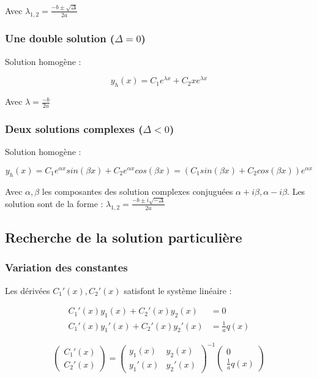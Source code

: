\documentclass[12pt,a4paper]{report}
\begin{document}
Avec $\lambda_{1,2} = \frac{-b \pm \sqrt{\Delta}}{2a}$

\subsubsection{Une double solution ($\Delta = 0$)}

Solution homogène :

$$y_h(x) = C_1e^{\lambda x} + C_2xe^{\lambda x}$$

Avec $\lambda = \frac{-b}{2a}$

\subsubsection{Deux solutions complexes ($\Delta < 0$)}

Solution homogène :

$$y_h(x) = C_1e^{\alpha x} sin(\beta x) + C_2e^{\alpha x} cos(\beta x) = \left( C_1 sin(\beta x) + C_2 cos(\beta x) \right) e^{\alpha x} $$

Avec $\alpha , \beta$ les composantes des solution complexes conjuguées $\alpha + i\beta , \alpha - i\beta$. Les solution sont de la forme : $\lambda_{1,2} = \frac{-b \pm i\sqrt{-\Delta}}{2a}$

\subsection{Recherche de la solution particulière}

\subsubsection{Variation des constantes}

Les dérivées $C_1'(x),C_2'(x)$ satisfont le système linéaire :

\begin{align*}
C_1'(x)y_1(x) + C_2'(x)y_2(x) &= 0 \\
C_1'(x)y_1'(x) + C_2'(x)y_2'(x) &= \frac{1}{a} q(x)
\end{align*}

$$
\begin{pmatrix}
C_1'(x) \\
C_2'(x)
\end{pmatrix}
 =
\begin{pmatrix}
y_1(x) & y_2(x) \\
y_1'(x) & y_2'(x) 
\end{pmatrix}^{-1}
\begin{pmatrix}
0 \\
\frac{1}{a} q(x)
\end{pmatrix}
$$
\end{document}
